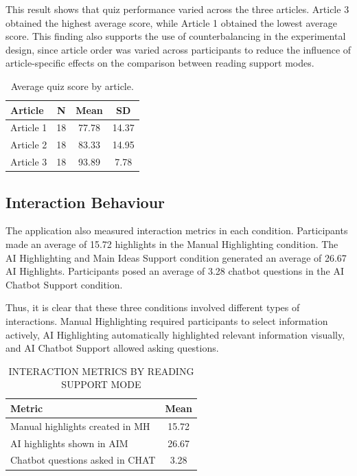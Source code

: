 \documentclass{IEEEtran}
\begin{document}
This result shows that quiz performance varied across the three articles. Article 3 obtained the highest average score, while Article 1 obtained the lowest average score. This finding also supports the use of counterbalancing in the experimental design, since article order was varied across participants to reduce the influence of article-specific effects on the comparison between reading support modes.

\begin{table}[H]
\centering
\caption{Average quiz score by article.}
\label{tab:quiz_by_article}
\scriptsize
\begin{tabular}{lccc}
\hline
Article & N & Mean & SD \\
\hline
Article 1 & 18 & 77.78 & 14.37 \\
Article 2 & 18 & 83.33 & 14.95 \\
Article 3 & 18 & 93.89 & 7.78 \\
\hline
\end{tabular}
\end{table}

\subsection{Interaction Behaviour}

The application also measured interaction metrics in each condition. Participants made an average of 15.72 highlights in the Manual Highlighting condition. The AI Highlighting and
Main Ideas Support condition generated an average of 26.67 AI Highlights. Participants posed an average of 3.28 chatbot questions in the AI Chatbot Support condition.

Thus, it is clear that these three conditions involved different types of interactions. Manual Highlighting required participants to select information actively, AI Highlighting automatically highlighted relevant information visually, and AI Chatbot Support allowed asking questions.


\begin{table}[H]
\centering
\caption{INTERACTION METRICS BY READING SUPPORT MODE}
\label{tab:interaction_metrics}
\scriptsize
\begin{tabular}{lc}
\hline
Metric & Mean \\
\hline
Manual highlights created in MH & 15.72 \\
AI highlights shown in AIM & 26.67 \\
Chatbot questions asked in CHAT & 3.28 \\
\hline
\end{tabular}
\end{table}
\end{document}
